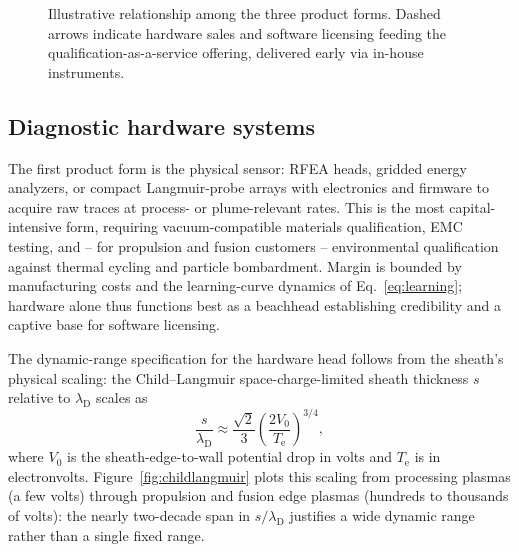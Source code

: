 \begin{figure}[htbp]
\centering
{}
\caption{Illustrative relationship among the three product forms. Dashed arrows indicate hardware sales and software licensing feeding the qualification-as-a-service offering, delivered early via in-house instruments.}
\label{fig:productflow}
\end{figure}

\subsection{Diagnostic hardware systems}

The first product form is the physical sensor: RFEA heads, gridded energy analyzers, or compact Langmuir-probe arrays with electronics and firmware to acquire raw traces at process- or plume-relevant rates. This is the most capital-intensive form, requiring vacuum-compatible materials qualification, EMC testing, and -- for propulsion and fusion customers -- environmental qualification against thermal cycling and particle bombardment. Margin is bounded by manufacturing costs and the learning-curve dynamics of Eq.~\eqref{eq:learning}; hardware alone thus functions best as a beachhead establishing credibility and a captive base for software licensing.

The dynamic-range specification for the hardware head follows from the sheath's physical scaling: the Child--Langmuir space-charge-limited sheath thickness $s$ relative to $\lambda_{\mathrm{D}}$ scales as
\begin{equation}
\frac{s}{\lambda_{\mathrm{D}}} \approx \frac{\sqrt{2}}{3}\left(\frac{2 V_{0}}{T_{\mathrm{e}}}\right)^{3/4},
\label{ch22-eq:childlangmuir}
\end{equation}
where $V_{0}$ is the sheath-edge-to-wall potential drop in volts and $T_{\mathrm{e}}$ is in electronvolts. Figure~\ref{fig:childlangmuir} plots this scaling from processing plasmas (a few volts) through propulsion and fusion edge plasmas (hundreds to thousands of volts): the nearly two-decade span in $s/\lambda_{\mathrm{D}}$ justifies a wide dynamic range rather than a single fixed range.

